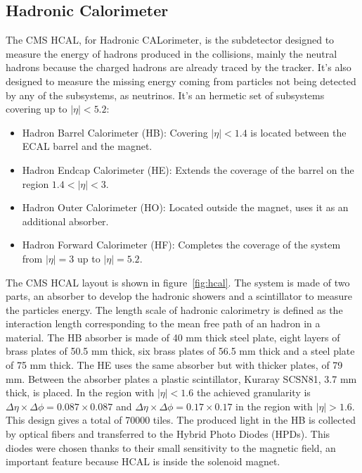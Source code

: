 
\subsection{Hadronic Calorimeter}
\label{sec:hcal}

The CMS HCAL, for Hadronic CALorimeter, is the subdetector designed to measure the energy of hadrons produced in the collisions, mainly the neutral hadrons because the charged hadrons are already traced by the tracker. It's also designed to measure the missing energy coming from particles not being detected by any of the subsystems, as neutrinos. It's an hermetic set of subsystems covering up to $|\eta|<5.2$:
\begin{itemize}
\item Hadron Barrel Calorimeter (HB): Covering $|\eta|<1.4$ is located between the ECAL barrel and the magnet. 
\item Hadron Endcap Calorimeter (HE): Extends the coverage of the barrel on the region $1.4<|\eta|<3$.
\item Hadron Outer Calorimeter (HO): Located outside the magnet, uses it as an additional absorber.
\item Hadron Forward Calorimeter (HF): Completes the coverage of the system from $|\eta|=3$ up to $|\eta|=5.2$.
\end{itemize}

The CMS HCAL layout is shown in figure~\ref{fig:hcal}. The system is made of two parts, an absorber to develop the hadronic showers and a scintillator to measure the particles energy. The length scale of hadronic calorimetry is defined as the interaction length corresponding to the mean free path of an hadron in a material. The HB absorber is made of 40 mm thick steel plate, eight layers of brass plates of 50.5 mm thick, six brass plates of 56.5 mm thick and a steel plate of 75 mm thick. The HE uses the same absorber but with thicker plates, of 79 mm. Between the absorber plates a plastic scintillator, Kuraray SCSN81, 3.7 mm thick, is placed. In the region with $|\eta|<1.6$ the achieved granularity is $\Delta\eta\times\Delta\phi=0.087\times 0.087$ and $\Delta\eta\times\Delta\phi=0.17\times 0.17$ in the region with $|\eta|>1.6$. This design gives a total of 70000 tiles. The produced light in the HB is collected by optical fibers and transferred to the Hybrid Photo Diodes (HPDs). This diodes were chosen thanks to their small sensitivity to the magnetic field, an important feature because HCAL is inside the solenoid magnet. %

